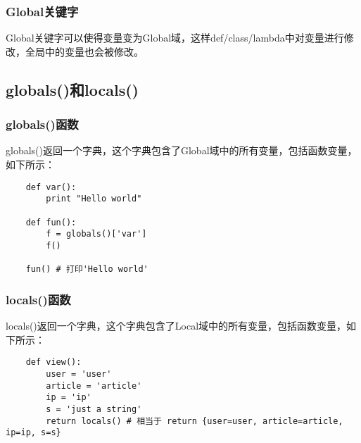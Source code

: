 \documentclass[a4paper,left=2.5cm,right=2.5cm,11pt]{article}
\begin{document}
\subsubsection{Global关键字}
	Global关键字可以使得变量变为Global域，这样def/class/lambda中对变量进行修改，全局中的变量也会被修改。

\subsection{globals()和locals()}
\subsubsection{globals()函数}
	globals()返回一个字典，这个字典包含了Global域中的所有变量，包括函数变量，如下所示：
	\begin{lstlisting}
	def var():
		print "Hello world"

	def fun():
		f = globals()['var']
		f()

	fun() # 打印'Hello world'
	\end{lstlisting}

\subsubsection{locals()函数}
	locals()返回一个字典，这个字典包含了Local域中的所有变量，包括函数变量，如下所示：
	\begin{lstlisting}
	def view():
		user = 'user'
		article = 'article'
		ip = 'ip'
		s = 'just a string'
		return locals() # 相当于 return {user=user, article=article, ip=ip, s=s}
	\end{lstlisting}
\end{document}
